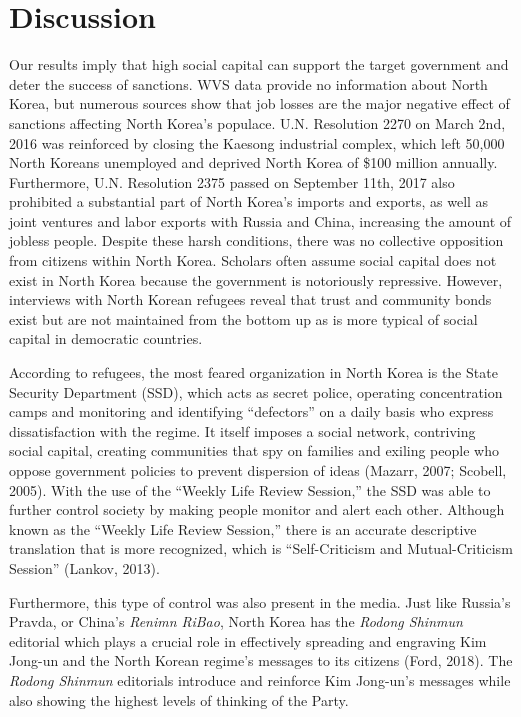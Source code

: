 \documentclass[
  english,
  man]{apa6}
\begin{document}
\hypertarget{discussion}{%
\section{Discussion}\label{discussion}}

Our results imply that high social capital can support the target government and deter the success of sanctions. WVS data provide no information about North Korea, but numerous sources show that job losses are the major negative effect of sanctions affecting North Korea's populace. U.N. Resolution 2270 on March 2nd, 2016 was reinforced by closing the Kaesong industrial complex, which left 50,000 North Koreans unemployed and deprived North Korea of \$100 million annually. Furthermore, U.N. Resolution 2375 passed on September 11th, 2017 also prohibited a substantial part of North Korea's imports and exports, as well as joint ventures and labor exports with Russia and China, increasing the amount of jobless people. Despite these harsh conditions, there was no collective opposition from citizens within North Korea. Scholars often assume social capital does not exist in North Korea because the government is notoriously repressive. However, interviews with North Korean refugees reveal that trust and community bonds exist but are not maintained from the bottom up as is more typical of social capital in democratic countries.

According to refugees, the most feared organization in North Korea is the State Security Department (SSD), which acts as secret police, operating concentration camps and monitoring and identifying ``defectors'' on a daily basis who express dissatisfaction with the regime. It itself imposes a social network, contriving social capital, creating communities that spy on families and exiling people who oppose government policies to prevent dispersion of ideas (Mazarr, 2007; Scobell, 2005). With the use of the ``Weekly Life Review Session,'' the SSD was able to further control society by making people monitor and alert each other. Although known as the ``Weekly Life Review Session,'' there is an accurate descriptive translation that is more recognized, which is ``Self-Criticism and Mutual-Criticism Session'' (Lankov, 2013).

Furthermore, this type of control was also present in the media. Just like Russia's Pravda, or China's \emph{Renimn RiBao}, North Korea has the \emph{Rodong Shinmun} editorial which plays a crucial role in effectively spreading and engraving Kim Jong-un and the North Korean regime's messages to its citizens (Ford, 2018). The \emph{Rodong Shinmun} editorials introduce and reinforce Kim Jong-un's messages while also showing the highest levels of thinking of the Party.
\end{document}
